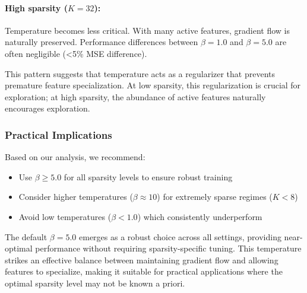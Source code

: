 \paragraph{High sparsity ($K=32$):} Temperature becomes less critical. With many active features, gradient flow is naturally preserved. Performance differences between $\beta=1.0$ and $\beta=5.0$ are often negligible (<5\% MSE difference).

This pattern suggests that temperature acts as a regularizer that prevents premature feature specialization. At low sparsity, this regularization is crucial for exploration; at high sparsity, the abundance of active features naturally encourages exploration.

\subsubsection{Practical Implications}

Based on our analysis, we recommend:
\begin{itemize}
    \item Use $\beta \geq 5.0$ for all sparsity levels to ensure robust training
    \item Consider higher temperatures ($\beta \approx 10$) for extremely sparse regimes ($K < 8$)
    \item Avoid low temperatures ($\beta < 1.0$) which consistently underperform
\end{itemize}

The default $\beta=5.0$ emerges as a robust choice across all settings, providing near-optimal performance without requiring sparsity-specific tuning. This temperature strikes an effective balance between maintaining gradient flow and allowing features to specialize, making it suitable for practical applications where the optimal sparsity level may not be known a priori. 